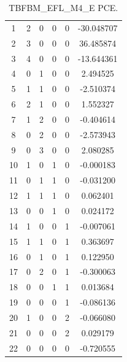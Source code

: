 \documentclass[preprint,12pt]{elsarticle}
\begin{document}
\begin{table}
\begin{minipage}[h!]{0.23\textwidth}
{\begin{tabular}{|c|ccccc|}
1  &   2 &   0 &   0 &   0 & -30.048707 \\
2  &   3 &   0 &   0 &   0 &  36.485874 \\
3  &   4 &   0 &   0 &   0 & -13.644361 \\
4  &   0 &   1 &   0 &   0 &   2.494525 \\
5  &   1 &   1 &   0 &   0 &  -2.510374 \\
6  &   2 &   1 &   0 &   0 &   1.552327 \\
7  &   1 &   2 &   0 &   0 &  -0.404614 \\
8  &   0 &   2 &   0 &   0 &  -2.573943 \\
9  &   0 &   3 &   0 &   0 &   2.080285 \\
10 &   1 &   0 &   1 &   0 &  -0.000183 \\
11 &   0 &   1 &   1 &   0 &  -0.031200 \\
12 &   1 &   1 &   1 &   0 &   0.062401 \\
13 &   0 &   0 &   1 &   0 &   0.024172 \\
14 &   1 &   0 &   0 &   1 &  -0.007061 \\
15 &   1 &   1 &   0 &   1 &   0.363697 \\
16 &   0 &   1 &   0 &   1 &   0.122950 \\
17 &   0 &   2 &   0 &   1 &  -0.300063 \\
18 &   0 &   0 &   1 &   1 &   0.013684 \\
19 &   0 &   0 &   0 &   1 &  -0.086136 \\
20 &   1 &   0 &   0 &   2 &  -0.066080 \\
21 &   0 &   0 &   0 &   2 &   0.029179 \\
22 &   0 &   0 &   0 &   0 &  -0.720555 \\
\hline
\end{tabular}}
\caption{\tiny TBFBM\_EFL\_M4\_E PCE.}
\end{minipage}%
%
\begin{minipage}[h!]{0.23\textwidth}
\end{minipage}
\end{table}
\end{document}
